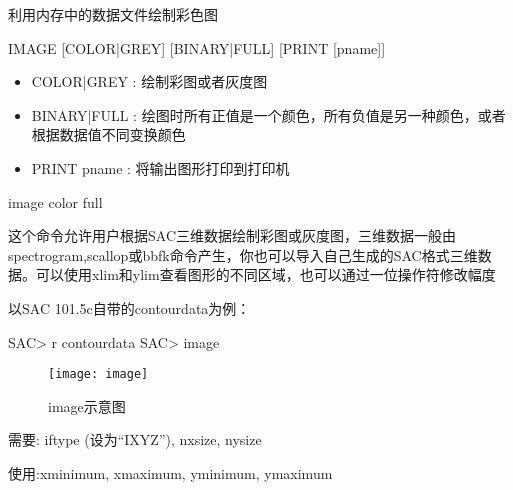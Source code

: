 \label{cmd:image}

利用内存中的数据文件绘制彩色图

\begin{SACSTX}
IMAGE [COLOR|GREY] [BINARY|FULL] [PRINT [pname]]
\end{SACSTX}

\begin{itemize}
\item COLOR|GREY :  绘制彩图或者灰度图
\item BINARY|FULL :  绘图时所有正值是一个颜色，所有负值是另一种颜色，或者根据数据值不同变换颜色 
\item PRINT pname : 将输出图形打印到打印机 
\end{itemize}

\begin{SACDFT}
image color full
\end{SACDFT}

这个命令允许用户根据SAC三维数据绘制彩图或灰度图，三维数据一般由spectrogram,scallop或bbfk命令产生，你也可以导入自己生成的SAC格式三维数据。可以使用xlim和ylim查看图形的不同区域，也可以通过一位操作符修改幅度

以SAC 101.5c自带的contourdata为例：
\begin{SACCode}
SAC> r contourdata
SAC> image
\end{SACCode}

\begin{figure}[!ht]
\centering
\texttt{[image: image]}
\caption{image示意图}
\end{figure}

需要: iftype (设为``IXYZ''), nxsize, nysize

使用:xminimum, xmaximum, yminimum, ymaximum
